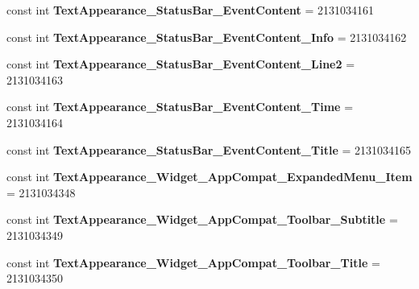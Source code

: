 \begin{DoxyCompactItemize}
\item 
\hypertarget{classClient_1_1Droid_1_1Resource_1_1Style_a354a2790cddb609c9ee0fe7bcf1da878}{}const int {\bfseries Text\+Appearance\+\_\+\+Status\+Bar\+\_\+\+Event\+Content} = 2131034161\label{classClient_1_1Droid_1_1Resource_1_1Style_a354a2790cddb609c9ee0fe7bcf1da878}

\item 
\hypertarget{classClient_1_1Droid_1_1Resource_1_1Style_abb8ebaeabe3b6c8adb5010bd8e44c2bf}{}const int {\bfseries Text\+Appearance\+\_\+\+Status\+Bar\+\_\+\+Event\+Content\+\_\+\+Info} = 2131034162\label{classClient_1_1Droid_1_1Resource_1_1Style_abb8ebaeabe3b6c8adb5010bd8e44c2bf}

\item 
\hypertarget{classClient_1_1Droid_1_1Resource_1_1Style_a4baeca603e1630ae987d590d1127a681}{}const int {\bfseries Text\+Appearance\+\_\+\+Status\+Bar\+\_\+\+Event\+Content\+\_\+\+Line2} = 2131034163\label{classClient_1_1Droid_1_1Resource_1_1Style_a4baeca603e1630ae987d590d1127a681}

\item 
\hypertarget{classClient_1_1Droid_1_1Resource_1_1Style_a9f67bec49b1737c5b3bc99d600c7e7ea}{}const int {\bfseries Text\+Appearance\+\_\+\+Status\+Bar\+\_\+\+Event\+Content\+\_\+\+Time} = 2131034164\label{classClient_1_1Droid_1_1Resource_1_1Style_a9f67bec49b1737c5b3bc99d600c7e7ea}

\item 
\hypertarget{classClient_1_1Droid_1_1Resource_1_1Style_a7ffc76b1203310f8739221681b79f324}{}const int {\bfseries Text\+Appearance\+\_\+\+Status\+Bar\+\_\+\+Event\+Content\+\_\+\+Title} = 2131034165\label{classClient_1_1Droid_1_1Resource_1_1Style_a7ffc76b1203310f8739221681b79f324}

\item 
\hypertarget{classClient_1_1Droid_1_1Resource_1_1Style_aeb7b4c0e69bee8b15d1575f5adbf44e6}{}const int {\bfseries Text\+Appearance\+\_\+\+Widget\+\_\+\+App\+Compat\+\_\+\+Expanded\+Menu\+\_\+\+Item} = 2131034348\label{classClient_1_1Droid_1_1Resource_1_1Style_aeb7b4c0e69bee8b15d1575f5adbf44e6}

\item 
\hypertarget{classClient_1_1Droid_1_1Resource_1_1Style_a64e07d9733f2f8ab0d04735c959ba193}{}const int {\bfseries Text\+Appearance\+\_\+\+Widget\+\_\+\+App\+Compat\+\_\+\+Toolbar\+\_\+\+Subtitle} = 2131034349\label{classClient_1_1Droid_1_1Resource_1_1Style_a64e07d9733f2f8ab0d04735c959ba193}

\item 
\hypertarget{classClient_1_1Droid_1_1Resource_1_1Style_a8b1c95b0611a16de8aaa6050d743ab31}{}const int {\bfseries Text\+Appearance\+\_\+\+Widget\+\_\+\+App\+Compat\+\_\+\+Toolbar\+\_\+\+Title} = 2131034350\label{classClient_1_1Droid_1_1Resource_1_1Style_a8b1c95b0611a16de8aaa6050d743ab31}


\end{DoxyCompactItemize}
